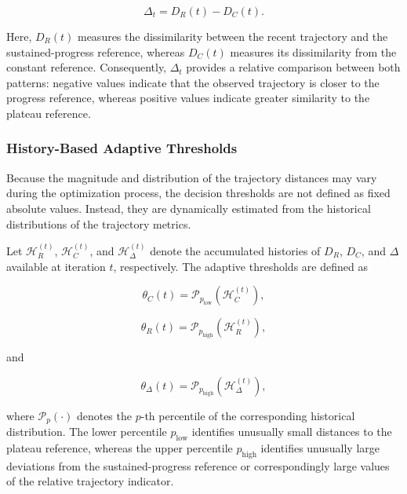 \documentclass[journal,article,submit,moreauthors]{Definitions/mdpi}
\begin{document}
\begin{equation}
\Delta_t = D_R(t)-D_C(t).
\label{eq:trajectory_delta}
\end{equation}

Here, $D_R(t)$ measures the dissimilarity between the recent trajectory and
the sustained-progress reference, whereas $D_C(t)$ measures its
dissimilarity from the constant reference. Consequently, $\Delta_t$
provides a relative comparison between both patterns: negative values
indicate that the observed trajectory is closer to the progress reference,
whereas positive values indicate greater similarity to the plateau
reference.


\subsubsection{History-Based Adaptive Thresholds}

Because the magnitude and distribution of the trajectory distances may vary
during the optimization process, the decision thresholds are not defined as
fixed absolute values. Instead, they are dynamically estimated from the
historical distributions of the trajectory metrics.

Let $\mathcal{H}_{R}^{(t)}$, $\mathcal{H}_{C}^{(t)}$, and
$\mathcal{H}_{\Delta}^{(t)}$ denote the accumulated histories of $D_R$,
$D_C$, and $\Delta$ available at iteration $t$, respectively. The adaptive
thresholds are defined as

\begin{equation}
\theta_C(t)
=
\mathcal{P}_{p_{\mathrm{low}}}
\left(\mathcal{H}_{C}^{(t)}\right),
\label{eq:threshold_c}
\end{equation}

\begin{equation}
\theta_R(t)
=
\mathcal{P}_{p_{\mathrm{high}}}
\left(\mathcal{H}_{R}^{(t)}\right),
\label{eq:threshold_r}
\end{equation}

and

\begin{equation}
\theta_{\Delta}(t)
=
\mathcal{P}_{p_{\mathrm{high}}}
\left(\mathcal{H}_{\Delta}^{(t)}\right),
\label{eq:threshold_delta}
\end{equation}

where $\mathcal{P}_{p}(\cdot)$ denotes the $p$-th percentile of the
corresponding historical distribution. The lower percentile
$p_{\mathrm{low}}$ identifies unusually small distances to the plateau
reference, whereas the upper percentile $p_{\mathrm{high}}$ identifies
unusually large deviations from the sustained-progress reference or
correspondingly large values of the relative trajectory indicator.
\end{document}
